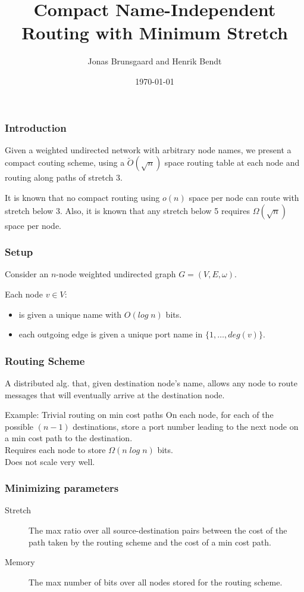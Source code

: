 \documentclass[10pt, compress]{beamer}
\title{Compact Name-Independent Routing with Minimum Stretch}
\subtitle{}
\date{\today}
\author{Jonas Brunsgaard and Henrik Bendt}
\institute{DIKU}
\begin{document}
\maketitle

\begin{frame}[fragile]
  \frametitle{Introduction}
    Given a weighted undirected network with arbitrary node names, we present a compact couting scheme, using a $\tilde{O}(\sqrt{n})$ space routing table at each node and routing along paths of stretch 3.

    It is known that no compact routing using $o(n)$ space per node can route with stretch below 3. Also, it is known that any stretch below 5 requires $\Omega(\sqrt{n})$ space per node.
\end{frame}

\begin{frame}[fragile]
  \frametitle{Setup}
    Consider an $n$-node weighted undirected graph $G=(V,E,\omega)$.

    Each node $v\in V$:
    \begin{itemize}
        \item is given a unique name with $O(log\; n)$ bits.
        \item each outgoing edge is given a unique port name in $\{1,\dots,deg(v)\}$.
    \end{itemize}
\end{frame}

\begin{frame}[fragile]
  \frametitle{Routing Scheme}
  A distributed alg. that, given destination node's name, allows any node to route messages that will eventually arrive at the destination node.

  \begin{block}{Example: Trivial routing on min cost paths}
    On each node, for each of the possible $(n-1)$ destinations, store a port number leading to the next node on a min cost path to the destination.\\
    Requires each node to store $\Omega (n\; log\; n)$ bits.\\
    Does not scale very well.
  \end{block}
\end{frame}

\begin{frame}[fragile]
  \frametitle{Minimizing parameters}
  \begin{description}
    \item[Stretch] The max ratio over all source-destination pairs between the cost of the path taken by the routing scheme and the cost of a min cost path.
    \item[Memory] The max number of bits over all nodes stored for the routing scheme.
  \end{description}
\end{frame}
\end{document}
